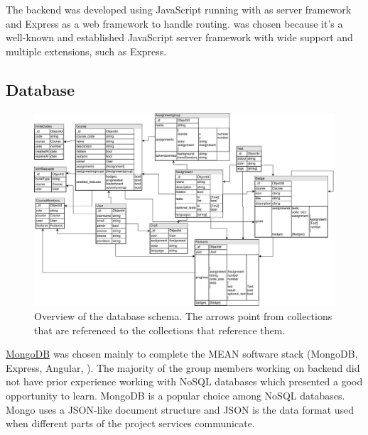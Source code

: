 
The backend was developed using JavaScript running with \nodejs{} as server framework and Express as a web framework to handle routing. \nodejs{} was chosen because it's a well-known and established JavaScript server framework with wide support and multiple extensions, such as Express. 

\subsection{Database} \label{database}


\begin{figure}
    \centering
    \includegraphics[width=\textwidth]{img/gpp_database-schema.jpg}
    \caption{Overview of the database schema. The arrows point from collections that are referenced to the collections that reference them.}
    \label{fig:schema}
\end{figure}
		
\href{https://www.mongodb.com}{MongoDB} was chosen mainly to complete the MEAN software stack (MongoDB, Express, Angular, \nodejs{}). The majority of the group members working on backend did not have prior experience working with NoSQL databases which presented a good opportunity to learn. MongoDB is a popular choice among NoSQL databases. Mongo uses a JSON-like document structure and JSON is the data format used when different parts of the project services communicate.

